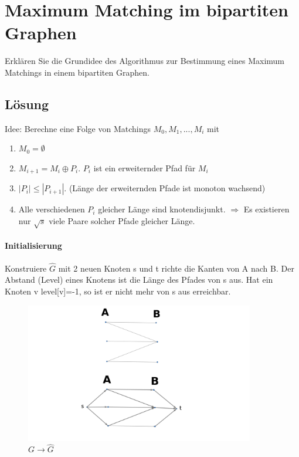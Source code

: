 \section{Maximum Matching im bipartiten Graphen}
Erklären Sie die Grundidee des Algorithmus zur Bestimmung eines Maximum Matchings in einem bipartiten Graphen.

\subsection*{Lösung}
Idee: Berechne eine Folge von Matchings $ M_0, M_1, ..., M_i $ mit 
\begin{enumerate}
    \item $ M_0 = \emptyset $
    \item $ M_{i+1} = M_i \oplus P_i $. $ P_i $ ist ein erweiternder Pfad für $ M_i $
    \item $ |P_i| \leq |P_{i + 1}| $. (Länge der erweiternden Pfade ist monoton wachsend)
    \item Alle verschiedenen $ P_i $ gleicher Länge sind knotendisjunkt. $ \Rightarrow $ Es existieren nur $ \sqrt{s} $ viele Paare solcher Pfade gleicher Länge.
\end{enumerate}

\paragraph{Initialisierung} Konstruiere $\hat{G}$ mit 2 neuen Knoten s und t richte die Kanten von A nach B. Der Abstand (Level) eines Knotens ist die Länge des Pfades von s aus. Hat ein Knoten v level[v]=-1, so ist er nicht mehr von s aus erreichbar.
\begin{figure}[h]
    \begin{center}
        \includegraphics[width=10cm]{maxmatch}
        \caption{$ G \rightarrow \hat{G} $}
        \label{fig:}
    \end{center}
\end{figure}

